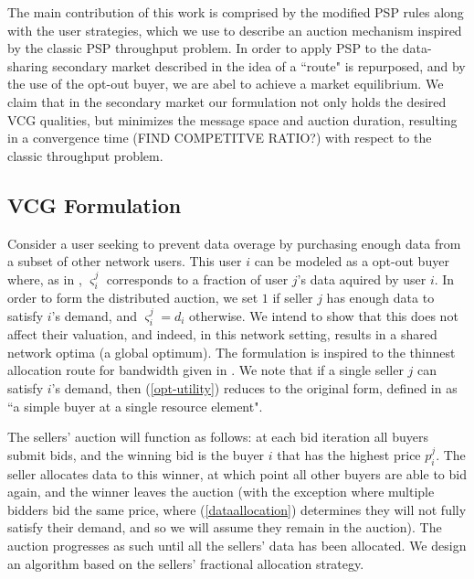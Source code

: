\documentclass[12pt]{article}
\theoremstyle{definition}
\newcommand{\vs}{\varsigma}
\begin{document}
\begin{multicols}{2}
The main contribution of this work is comprised by the modified PSP rules
along with the user strategies, which we use to
describe an auction mechanism inspired by the classic PSP throughput problem. In order to apply PSP to the data-sharing secondary market described in
\cite{zheng} the idea of a ``route" is repurposed, and by the use of the
opt-out buyer, we are abel to achieve a market equilibrium. We claim that in
the secondary market our
formulation not only holds the desired VCG qualities, but minimizes the message
space and auction duration, resulting in a convergence time (FIND COMPETITVE RATIO?)
with respect to the classic throughput problem.


\subsection{VCG Formulation}
Consider a user seeking to prevent
data overage by purchasing enough data from a subset of other network users.
This user $i$ can be modeled as a opt-out buyer where, as in \cite{semret},
$\vs_i^j$ corresponds to a fraction of user $j$'s data aquired by user $i$. In order to form the
distributed auction, we set $1$ if seller $j$ has enough data to
satisfy $i$'s demand, and $\vs_i^j=d_i$ otherwise. We intend to show that this
does not affect their valuation, and indeed, in this network setting, results in a shared network optima (a
global optimum). The formulation is inspired to the thinnest allocation route for
bandwidth given in \cite{lazar}. We note that if a single seller $j$ can
satisfy $i$'s demand, then
(\ref{opt-utility}) reduces to the original form, defined in
\cite{semret} as ``a simple buyer at a single resource element".

The sellers' auction will function as follows: at each bid iteration all buyers
submit bids, and the winning bid is the buyer $i$ that has the highest price
$p_i^j$. The seller allocates
data to this winner, at which point all other buyers are able to bid again, and
the winner leaves the auction (with the exception where multiple bidders bid
the same price, where (\ref{dataallocation}) determines they will not fully
satisfy their demand, and so we will assume they remain in the auction). The auction progresses as such until all the
sellers' data has been allocated. We design an algorithm based on the sellers'
fractional allocation strategy.


\end{multicols}
\end{document}
